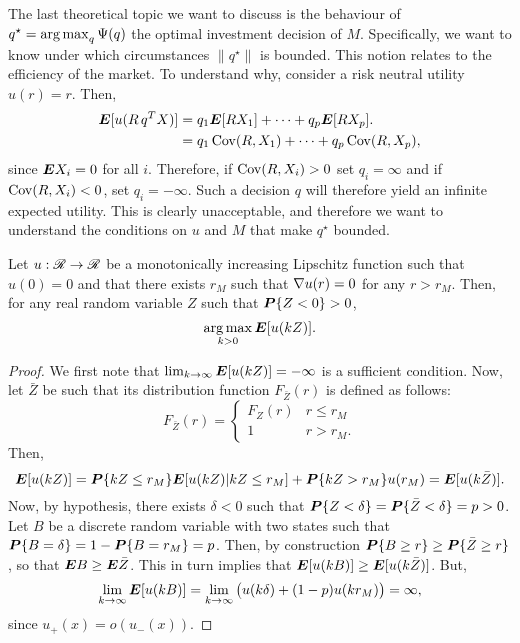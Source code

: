 The last theoretical topic we want to discuss is the behaviour of
$q^\star = \operatorname*{arg\,max}_q\Psi(q)$ the optimal investment decision of $M$. Specifically, we want
to know under which circumstances $\|q^\star\|$ is bounded. This notion relates to the
efficiency of the market. To understand why, consider a risk neutral utility $u(r) =
r$. Then,
\begin{align*}
  \bm E[u(R\,q^TX)] &= q_1\bm E[RX_1] + \cdots + q_p\bm E[RX_p].\\
                 &= q_1\operatorname{Cov}(R,X_1) + \cdots + q_p\operatorname{Cov}(R,X_p),
\end{align*}
since $\bm E X_i=0$ for all $i$. Therefore, if $\operatorname{Cov}(R,X_i)>0$ set $q_i=\infty$ and if
$\operatorname{Cov}(R,X_i)<0$, set $q_i=-\infty$. Such a decision $q$ will therefore yield an infinite
expected utility. This is clearly unacceptable, and therefore we want to understand the
conditions on $u$ and $M$ that make $q^\star$ bounded.

\begin{lemma}
  Let $u:\mathscr{R}\to\mathscr{R}$ be a monotonically increasing Lipschitz function such that
  $u(0) = 0$ and that there exists $r_M$ such that $\nabla u(r) = 0$ for any $r>r_M$. Then,
  for any real random variable $Z$ such that $\bm P\{Z<0\}>0$,
  \[
    \operatorname*{arg\,max}_{k>0} \bm E[u(kZ)].
  \]
\end{lemma}

\begin{proof}
  We first note that $\lim_{k\to\infty}\bm E[u(kZ)]=-\infty$ is a sufficient condition. Now,
  let $\bar Z$ be such that its distribution function $F_{\bar Z}(r)$ is defined as
  follows:
  \[
    F_{\bar Z}(r) =
    \begin{cases}
      F_Z(r)&r \leq r_M\\
      1 & r>r_M.
    \end{cases}
  \]
  Then, 
  \[
    \bm E[u(kZ)] = \bm P\{kZ \leq r_M\}\bm E[u(kZ)|kZ\leq r_M] + \bm P\{kZ > r_M\}u(r_M) = \bm E[u(k\bar Z)].
  \]
  Now, by hypothesis, there exists $\delta<0$ such that
  $\bm P\{Z<\delta\}=\bm P\{\bar Z<\delta\} = p > 0$. Let $B$ be a discrete random variable
  with two states such that $\bm P\{B=\delta\} = 1-\bm P\{B=r_M\} = p$. Then, by construction
  $\bm P\{B\geq r\} \geq \bm P\{\bar Z\geq r\}$, so that $\bm E B \geq \bm E\bar Z$. This in turn
  implies  that $\bm E[u(kB)] \geq \bm E[u(k\bar Z)]$. But,
  \[
    \lim_{k\to\infty}\bm E[u(kB)] = \lim_{k\to\infty}\big(u(k\delta) + (1-p)u(kr_M)\big) = \infty,
  \]
  since $u_{+}(x) = o(u_{-}(x))$. 
\end{proof}

